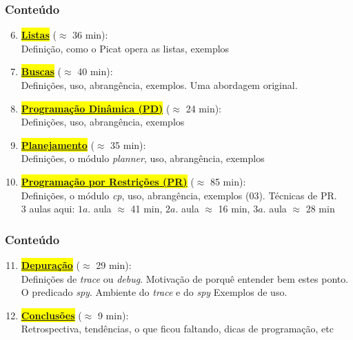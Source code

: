 			
\begin{frame}[fragile]
  \frametitle{Conteúdo}
  
  \begin{enumerate}

   \setcounter{enumi}{5}
    \item  \colorbox{yellow}{\textbf{\underline{Listas}}} ($\approx$ 36 min):\\
    Definição, como o Picat opera as listas, exemplos


    \pause
    \item  \colorbox{yellow}{\textbf{\underline{Buscas}}} ($\approx$ 40 min):\\
     Definições, uso, abrangência, exemplos. Uma abordagem
     original.

    \pause
    \item \colorbox{yellow}{\textbf{\underline{Programação Dinâmica (PD)}}} ($\approx$ 24 min):\\
    Definições, uso, abrangência, exemplos

    
    \pause
    \item \colorbox{yellow}{\textbf{\underline{Planejamento}}} ($\approx$ 35 min):\\
        Definições, o módulo \textit{planner}, uso, abrangência, exemplos

    \pause
		\item \colorbox{yellow}{\textbf{\underline{Programação por Restrições (PR)}}} ($\approx$ 85 min):\\
      Definições, o módulo \textit{cp}, uso, abrangência, exemplos (03).
      Técnicas de PR.\\
      3 aulas aqui: $1a.$ aula $\approx$ 41 min, $2a.$ aula $\approx$ 16 min,
      $3a.$ aula $\approx$ 28 min
     


\end{enumerate}

\end{frame}


			
\begin{frame}[fragile]
  \frametitle{Conteúdo}
  
  \begin{enumerate}

   \setcounter{enumi}{10}

 
     \item \colorbox{yellow}{\textbf{\underline{Depuração}}} ($\approx$ 29 min):\\
     Definições de \textit{trace}  ou \textit{debug}. Motivação de porquê entender bem estes 
     ponto. O predicado \textit{spy}. Ambiente do \textit{trace} e do \textit{spy}
     Exemplos de uso.
     
    \pause 
	\item  \colorbox{yellow}{\textbf{\underline{Conclusões}}} ($\approx$ 9 min):\\
    Retrospectiva, tendências, o que ficou faltando, 
    dicas de programação, etc

    
\end{enumerate}

\end{frame}



